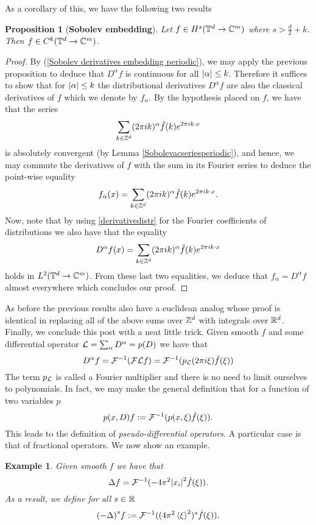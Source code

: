 \documentclass[12pt]{article}
\newtheorem{proposition}{Proposition}
\newtheorem{example}{Example}
\newcommand{\br}[1]{\left\langle#1\right\rangle}
\begin{document}
As a corollary of this, we have the following two results
\begin{proposition}[\textbf{Sobolev embedding}]\label{characterization smooth functions in Sobolev space}
	Let $f\in H^s({\mathbb T}^d\to\mathbb{C}^m)$ where $s>\frac{d}{2}+k$. Then   $f\in C^k({\mathbb T}^d\to\mathbb{C}^m)$.
\end{proposition}
\begin{proof}
	By (\ref{Sobolev derivatives embedding periodic}),
	we may apply the previous proposition to deduce that $D^\alpha f$ is continuous for all $\abs{\alpha}\leq k$. Therefore it suffices to show that for $\abs{\alpha}\leq k$ the distributional derivatives $D^\alpha f$ are also the classical derivatives of $f$ which we denote by $f_\alpha$.\bigbreak
	By the hypothesis placed on $f$, we have that the series
	\[\sum_{k\in{\mathbb Z}^d} (2\pi ik)^\alpha \hat{f}(k)e^{2\pi ik\cdot x} \]
	is absolutely convergent (by Lemma \ref{Sobolevacseriesperiodic}), and hence, we may commute the derivatives of $f$ with the sum in its Fourier series to deduce the point-wise equality
	\[f_\alpha(x)=\sum_{k\in{\mathbb Z}^d} (2\pi ik)^\alpha \hat{f}(k)e^{2\pi ik\cdot x}.\]
	Now, note that by using \eqref{derivativedistr} for the Fourier coefficients of distributions we also have that the equality
	\[D^\alpha f(x)=\sum_{k\in{\mathbb Z}^d} (2\pi ik)^\alpha \hat{f}(k)e^{2\pi ik\cdot x}\]
	holds in $ L^2({\mathbb T}^d\to\mathbb{C}^m)$. From these last two equalities, we deduce that $f_\alpha=D^\alpha f$ almost everywhere which concludes our proof.
\end{proof}
As before the previous results also have a euclidean analog whose proof is identical in replacing all of the above sums over ${\mathbb Z}^d$ with integrals over ${\mathbb R}^d$.
Finally, we conclude this post with a neat little trick. Given smooth $f$ and some differential operator $\mathcal{L} =\sum_{\alpha} D^\alpha=p(D)$ we have that
\begin{equation*}
	D^\alpha f =\mathcal{F}^{-1}(\mathcal{F}  \mathcal{L} f)=\mathcal{F}^{-1}(p_{\mathcal{L}}(2 \pi i\xi )\hat{f}(\xi ))
\end{equation*}
The term $p_{\mathcal{L}}$ is called a Fourier multiplier and there is no need to limit ourselves to polynomials. In fact, we may make the general definition that for a function of two variables $p$
\begin{equation*}
	p(x,D)f:=\mathcal{F}^{-1}(p(x,\xi )\hat{f}(\xi )).
\end{equation*}
This leads to the definition of \emph{pseudo-differential operators}. A particular case is that of fractional operators. We now show an example.
\begin{example}
	Given smooth $f$ we have that
	\begin{equation*}
		\Delta f=\mathcal{F}^{-1}(-4 \pi^2 \abs{x_i}^2 \hat{f}(\xi )).
	\end{equation*}
	As a result, we define for all $s\in {\mathbb R}$
	\begin{equation*}
		{(-\Delta)}^sf:=\Ff^{-1} ((4\pi^2 \br{\xi }^2)^s\hat{f}(\xi )).
	\end{equation*}
\end{example}
\end{document}
